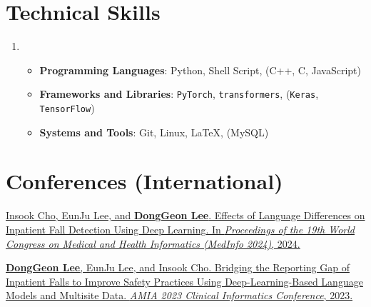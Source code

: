 \documentclass[letterpaper,11pt]{article}
\begin{document}
    \section{Technical Skills}
    \begin{enumerate}[noitemsep, leftmargin=*,label=]
        \item{
            \begin{itemize}[label=\bullet]
                \item{\textbf{Programming Languages}: Python, Shell Script, (C++, C, JavaScript)}
                \item{\textbf{Frameworks and Libraries}: \texttt{PyTorch}, \texttt{transformers}, (\texttt{Keras}, \texttt{TensorFlow})}
                \item{\textbf{Systems and Tools}: Git, Linux, \LaTeX, (MySQL)}
            \end{itemize}
        }
    \end{enumerate}

    \section{Conferences (International)}
    \begin{enumerate}[noitemsep, leftmargin=*,label={[\arabic*]}]
        \item \href{https://pubmed.ncbi.nlm.nih.gov/38426881/}{Insook Cho, EunJu Lee, and \textbf{DongGeon Lee}. Effects of Language Differences on Inpatient Fall Detection Using Deep Learning. In \textit{Proceedings of the 19th World Congress on Medical and Health Informatics (MedInfo 2024)}, 2024.}
        
        \item \href{https://bit.ly/cic23s47}{\textbf{DongGeon Lee}, EunJu Lee, and Insook Cho. Bridging the Reporting Gap of Inpatient Falls to Improve Safety Practices Using Deep-Learning-Based Language Models and Multisite Data. \textit{AMIA 2023 Clinical Informatics Conference}, 2023.}
    \end{enumerate}
        


\end{document}
